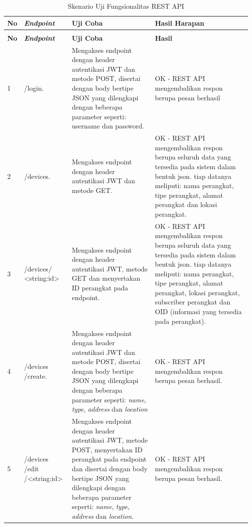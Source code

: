         		\begin{longtable}{|p{}|p{}|p{}|p{}|}					\caption{Skenario Uji Fungsionalitas REST API} \label{hasilujirestapi} \\
        			\hline
        			\textbf{No} & \textbf{\textit{Endpoint}} & \textbf{Uji Coba} & \textbf{Hasil Harapan} \\ \hline
        			\endfirsthead
        			\caption[]{Skenario Uji Fungsionalitas REST API} \\
        			\hline
        			\textbf{No} & \textbf{\textit{Endpoint}} & \textbf{Uji Coba} & \textbf{Hasil} \\ \hline
        			\endhead
        			\endfoot
        			\endlastfoot
        			
        			1 & /login. & Mengakses endpoint dengan header autentikasi JWT dan metode POST, disertai dengan body bertipe JSON yang dilengkapi dengan beberapa parameter seperti: username dan password. & OK - REST API mengembalikan respon berupa pesan berhasil \\ \hline
        			2 & /devices. & Mengakses endpoint dengan header autentikasi JWT dan metode GET. & OK - REST API mengembalikan respon berupa seluruh data yang tersedia pada sistem dalam bentuk json. tiap datanya meliputi: nama perangkat, tipe perangkat, alamat perangkat dan lokasi perangkat. \\ \hline
        			3 & /devices/ <string:id> & Mengakses endpoint dengan header autentikasi JWT, metode GET dan menyertakan ID perangkat pada endpoint. & OK - REST API mengembalikan respon berupa seluruh data yang tersedia pada sistem dalam bentuk json. tiap datanya meliputi: nama perangkat, tipe perangkat, alamat perangkat, lokasi perangkat, subscriber perangkat dan OID (informasi yang tersedia pada perangkat). \\ \hline
        			4 & /devices /create. & Mengakses endpoint dengan header autentikasi JWT dan metode POST, disertai dengan body bertipe JSON yang dilengkapi dengan beberapa parameter seperti: \textit{name}, \textit{type}, \textit{address} dan \textit{location} & OK - REST API mengembalikan respon berupa pesan berhasil. \\ \hline
        			5 & /devices /edit /<string:id> & Mengakses endpoint dengan header autentikasi JWT, metode POST, menyertakan ID perangkat pada endpoint dan disertai dengan body bertipe JSON yang dilengkapi dengan beberapa parameter seperti: \textit{name}, \textit{type}, \textit{address} dan \textit{location}. & OK - REST API mengembalikan respon berupa pesan berhasil. \\ \hline

\end{longtable}
